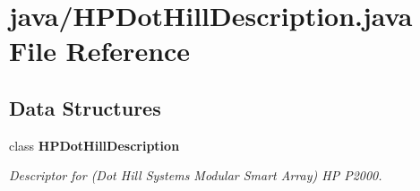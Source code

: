 \section{java/\-H\-P\-Dot\-Hill\-Description.java File Reference}
\label{HPDotHillDescription_8java}
\subsection*{Data Structures}
\begin{DoxyCompactItemize}
\item 
class {\bf H\-P\-Dot\-Hill\-Description}
\begin{DoxyCompactList}\small\item\em Descriptor for (Dot Hill Systems Modular Smart Array) H\-P P2000. \end{DoxyCompactList}\end{DoxyCompactItemize}
